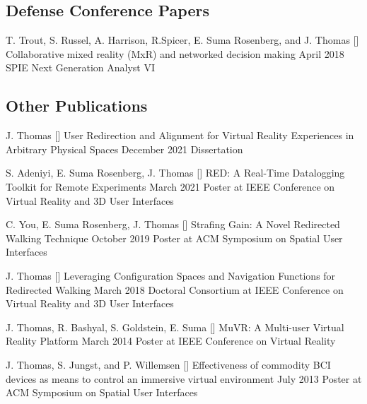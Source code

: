 \begin{cventries}
  \vspace{-.25cm}
  \subsection*{Defense Conference Papers}
  \cventry
    {T. Trout, S. Russel, A. Harrison, R.Spicer, E. Suma Rosenberg, and J. Thomas} %
    {[\thenpubs] Collaborative mixed reality (MxR) and networked decision making} %
    {April 2018} %
    {} %
    {SPIE Next Generation Analyst VI} %
    
  \vspace{-.25cm}    
  \subsection*{Other Publications}
  \cventry
    {J. Thomas} %
    {[\thenpubs] User Redirection and Alignment for Virtual Reality Experiences in Arbitrary Physical Spaces} %
    {December 2021} %
    {} %
    {Dissertation} %
    
  \cventry
    {S. Adeniyi, E. Suma Rosenberg, J. Thomas} %
    {[\thenpubs] RED: A Real-Time Datalogging Toolkit for Remote Experiments} %
    {March 2021} %
    {} %
    {Poster at IEEE Conference on Virtual Reality and 3D User Interfaces} %
    
  \cventry
    {C. You, E. Suma Rosenberg, J. Thomas} %
    {[\thenpubs] Strafing Gain: A Novel Redirected Walking Technique} %
    {October 2019} %
    {} %
    {Poster at ACM Symposium on Spatial User Interfaces} %
  
  \cventry
    {J. Thomas} %
    {[\thenpubs] Leveraging Configuration Spaces and Navigation Functions for Redirected Walking} %
    {March 2018} %
    {} %
    {Doctoral Consortium at IEEE Conference on Virtual Reality and 3D User Interfaces} %
    
  \cventry
    {J. Thomas, R. Bashyal, S. Goldstein, E. Suma} %
    {[\thenpubs] MuVR: A Multi-user Virtual Reality Platform} %
    {March 2014} %
    {} %
    {Poster at IEEE Conference on Virtual Reality} %
    
  \cventry
    {J. Thomas, S. Jungst, and P. Willemsen} %
    {[\thenpubs] Effectiveness of commodity BCI devices as means to control an immersive virtual environment} %
    {July 2013} %
    {} %
    {Poster at ACM Symposium on Spatial User Interfaces} %

\end{cventries}
